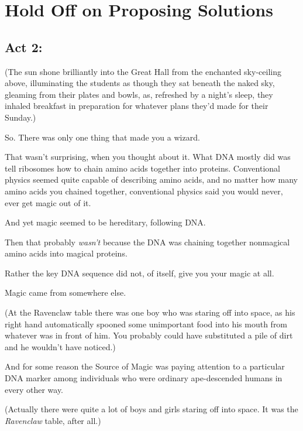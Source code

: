 \chapter{Hold Off on Proposing Solutions}

\section{Act 2:}

(The sun shone brilliantly into the Great Hall from the enchanted sky-ceiling
above, illuminating the students as though they sat beneath the naked sky,
gleaming from their plates and bowls, as, refreshed by a night's sleep, they
inhaled breakfast in preparation for whatever plans they'd made for their
Sunday.)

So. There was only one thing that made you a wizard.

That wasn't surprising, when you thought about it. What DNA mostly did was tell
ribosomes how to chain amino acids together into proteins. Conventional physics
seemed quite capable of describing amino acids, and no matter how many amino
acids you chained together, conventional physics said you would never, ever get
magic out of it.

And yet magic seemed to be hereditary, following DNA.

Then that probably \emph{wasn't} because the DNA was chaining together
nonmagical amino acids into magical proteins.

Rather the key DNA sequence did not, of itself, give you your magic at all.

Magic came from somewhere else.

(At the Ravenclaw table there was one boy who was staring off into space, as
his right hand automatically spooned some unimportant food into his mouth from
whatever was in front of him. You probably could have substituted a pile of
dirt and he wouldn't have noticed.)

And for some reason the Source of Magic was paying attention to a particular
DNA marker among individuals who were ordinary ape-descended humans in every
other way.

(Actually there were quite a lot of boys and girls staring off into space. It
was the \emph{Ravenclaw} table, after all.)

